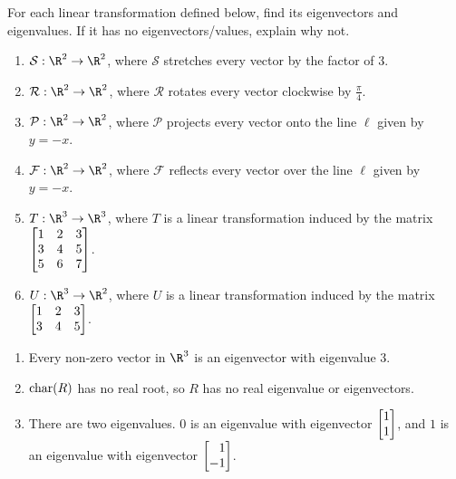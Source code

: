 
\begin{exercises}

	\begin{problist}
		\prob For each linear transformation defined below, find its eigenvectors
		and eigenvalues. If it has no eigenvectors/values, explain why not.
		\begin{enumerate}
			\item $\mathcal S:\R^{2}\to\R^{2}$, where $\mathcal S$ stretches
				every vector by the factor of $3$.

			\item $\mathcal R:\R^{2}\to\R^{2}$, where $\mathcal R$ rotates
				every vector clockwise by $\frac{\pi}{4}$.

			\item $\mathcal P:\R^{2}\to\R^{2}$, where $\mathcal P$ projects
				every vector onto the line $\ell$ given by $y=-x$.

			\item $\mathcal F:\R^{2}\to\R^{2}$, where $\mathcal F$ reflects
				every vector over the line $\ell$ given by $y=-x$.

			\item $T:\R^{3}\to\R^{3}$, where $T$ is a linear transformation
				induced by the matrix $\mat{1&2&3\\3&4&5\\5&6&7}$.

			\item $U:\R^{3}\to\R^{2}$, where $U$ is a linear transformation
				induced by the matrix $\mat{1&2&3\\3&4&5}$.
		\end{enumerate}


		\begin{solution}

			\begin{enumerate}
				\item Every non-zero vector in $\R^{3}$ is an eigenvector with
					eigenvalue 3.

				\item $\operatorname{char}(R)$ has no real root, so $R$ has no real eigenvalue
					or eigenvectors.

				\item There are two eigenvalues. $0$ is an eigenvalue with
					eigenvector $\mat{1 \\ 1}$, and $1$ is an
					eigenvalue with eigenvector $\mat{1\\-1}$.


\end{enumerate}
\end{solution}
\end{problist}
\end{exercises}
